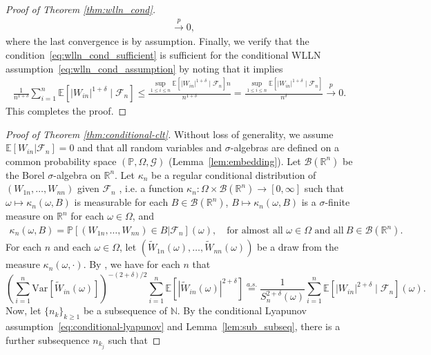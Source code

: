 \documentclass[aos]{imsart}
\theoremstyle{plain}
\theoremstyle{remark}
\newcommand{\E}{\mathbb E}								%
\newcommand{\V}{\mathrm{Var}}							%
\renewcommand{\P}{\mathbb{P}}							%
\newcommand{\R}{\mathbb{R}}								%
\newcommand{\convp}{\overset p \rightarrow}             %
\begin{document}
\begin{proof}[Proof of Theorem \ref{thm:wlln_cond}]
\begin{align*}
			&
			\convp0,
		\end{align*}
		where the last convergence is by assumption. Finally, we verify that the condition~\eqref{eq:wlln_cond_sufficient} is sufficient for the conditional WLLN assumption~\eqref{eq:wlln_cond_assumption} by noting that it implies
		\begin{align*}
			\frac{1}{n^{1+\delta}} \sum_{i = 1}^n \E[|W_{in}|^{1+\delta} \mid \mathcal{F}_n]\leq \frac{\sup_{1\leq i\leq n}\E[|W_{in}|^{1+\delta} \mid \mathcal{F}_n]n}{n^{1+\delta}}=\frac{\sup_{1\leq i\leq n}\E[|W_{in}|^{1+\delta} \mid \mathcal{F}_n]}{n^{\delta}} \convp 0.
		\end{align*}
		This completes the proof.
	\end{proof}
	
	\begin{proof}[Proof of Theorem \ref{thm:conditional-clt}] 
		Without loss of generality, we assume $\E[W_{in}|\mathcal{F}_n]=0$ and that all random variables and $\sigma$-algebras are defined on a common probability space $(\P, \Omega, \mathcal G)$ (Lemma~\ref{lem:embedding}). Let $\mathcal B(\R^n)$ be the Borel $\sigma$-algebra on $\R^n$. Let $\kappa_{n}$ be a regular conditional distribution of $(W_{1n}, \dots, W_{nn})$ given $\mathcal{F}_{n}$ \citep[Theorem 8.37]{Lista2017}, i.e. a function $\kappa_{n}: \Omega \times \mathcal B(\R^n) \rightarrow [0,\infty]$ such that $\omega \mapsto \kappa_{n}(\omega, B)$ is measurable for each $B \in \mathcal B(\R^n)$, $B \mapsto \kappa_{n}(\omega, B)$ is a $\sigma$-finite measure on $\R^n$ for each $\omega \in \Omega$, and 
		\begin{align*}
			\kappa_{n}(\omega, B) = \P[(W_{1n}, \dots, W_{nn})\in B|\mathcal{F}_{n}](\omega), \quad \text{for almost all } \omega \in \Omega \text{ and all} \ B \in \mathcal B(\R^n).
		\end{align*}
		For each $n$ and each $\omega \in \Omega$, let $(\widetilde W_{1n}(\omega), \dots, \widetilde W_{nn}(\omega))$ be a draw from the measure $\kappa_n(\omega,\cdot)$. By \citet[Theorem 8.38]{Lista2017}, we have for each $n$ that
		\begin{equation*}
			\left(\sum_{i = 1}^n \V[\widetilde W_{in}(\omega)]\right)^{-(2+\delta)/2}\sum_{i = 1}^n \E[|\widetilde W_{in}(\omega)|^{2+\delta}] \overset{a.s.}= \frac{1}{S_{n}^{2+\delta}(\omega)} \sum_{i = 1}^{n} \E[|W_{in}|^{2+\delta} \mid \mathcal{F}_{n}](\omega).
		\end{equation*}
		Now, let $\{n_k\}_{k \geq 1}$ be a subsequence of $\mathbb N$. By the conditional Lyapunov assumption~\eqref{eq:conditional-lyapunov} and Lemma~\ref{lem:sub_subseq}, there is a further subsequence $n_{k_j}$ such that

\end{proof}
\end{document}
